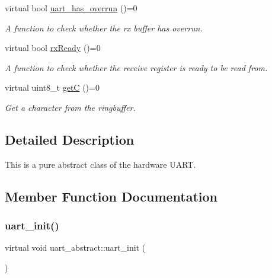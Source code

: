 \begin{DoxyCompactItemize}
virtual bool \hyperlink{classuart__abstract_a8a10405e3e52c8175899a443871c1598}{uart\+\_\+has\+\_\+overrun} ()=0
\begin{DoxyCompactList}\small\item\em A function to check whether the rx buffer has overrun. \end{DoxyCompactList}\item 
\mbox{\label{classuart__abstract_a3d93d3e15a85df80fcef701552f91080}} 
virtual bool \hyperlink{classuart__abstract_a3d93d3e15a85df80fcef701552f91080}{rx\+Ready} ()=0
\begin{DoxyCompactList}\small\item\em A function to check whether the receive register is ready to be read from. \end{DoxyCompactList}\item 
\mbox{\label{classuart__abstract_a701d4eec1363bec9a7677e3b1f6c68b3}} 
virtual uint8\+\_\+t \hyperlink{classuart__abstract_a701d4eec1363bec9a7677e3b1f6c68b3}{getC} ()=0
\begin{DoxyCompactList}\small\item\em Get a character from the ringbuffer. \end{DoxyCompactList}\end{DoxyCompactItemize}


\subsection{Detailed Description}
This is a pure abstract class of the hardware U\+A\+RT. 

\subsection{Member Function Documentation}
\mbox{\label{classuart__abstract_a44203f54f9cdbe8c3ea71ad65d3be62b}} 
\subsubsection{\texorpdfstring{uart\+\_\+init()}{uart\_init()}}
{\footnotesize\ttfamily virtual void uart\+\_\+abstract\+::uart\+\_\+init (\begin{DoxyParamCaption}{ }\end{DoxyParamCaption})\hspace{0.3cm}{\ttfamily [pure virtual]}}



